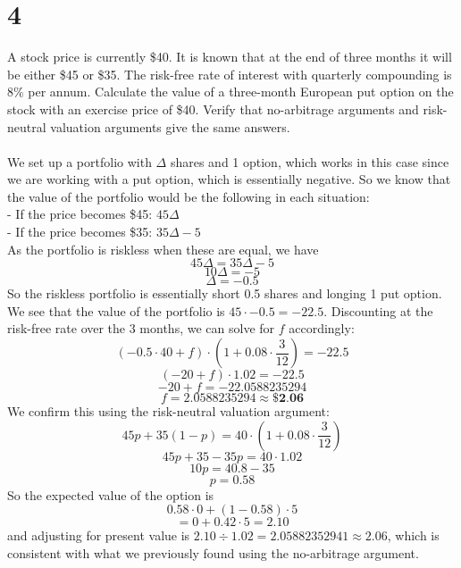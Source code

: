 \documentclass{article}
\begin{document}
{\Large 

\section*{4}
A stock price is currently \$40. It is known that at the end of three months it will be either \$45 or \$35. The risk-free rate of interest with quarterly compounding is 8\% per annum. Calculate the value of a three-month European put option on the stock with an exercise price of \$40. Verify that no-arbitrage arguments and risk-neutral valuation arguments give the same answers. \\ \\
We set up a portfolio with \(\Delta\) shares and 1 option, which works in this case since we are working with a put option, which is essentially negative. So we know that the value of the portfolio would be the following in each situation: \\
- If the price becomes \$45: \(45\Delta\) \\
- If the price becomes \$35: \(35\Delta - 5\)\\
As the portfolio is riskless when these are equal, we have 
\[
  45\Delta = 35\Delta - 5
\]
\[
  10\Delta = - 5
\]
\[
  \Delta = -0.5
\]
So the riskless portfolio is essentially short 0.5 shares and longing 1 put option. We see that the value of the portfolio is \(45 \cdot -0.5 = -22.5\). Discounting at the risk-free rate over the 3 months, we can solve for \(f\) accordingly:
\[
  (-0.5 \cdot 40 + f) \cdot (1 + 0.08 \cdot \frac{3}{12}) = -22.5
\]
\[
  (-20 + f) \cdot 1.02 = -22.5
\]
\[
  -20 + f = -22.0588235294
\]
\[
  f = 2.0588235294 \approx \boxed{\textbf{\$2.06}}
\]
We confirm this using the risk-neutral valuation argument:
\[
  45p + 35(1 - p) = 40 \cdot (1 + 0.08 \cdot \frac{3}{12})
\]
\[
  45p + 35 - 35p = 40 \cdot 1.02
\]
\[
  10p = 40.8 - 35
\]
\[
  p = 0.58
\]
So the expected value of the option is 
\[
  0.58 \cdot 0 + (1 - 0.58) \cdot 5
\]
\[
  = 0 + 0.42 \cdot 5 = 2.10
\]
and adjusting for present value is \(2.10 \div 1.02 = 2.05882352941 \approx 2.06\), which is consistent with what we previously found using the no-arbitrage argument.

}
\end{document}
